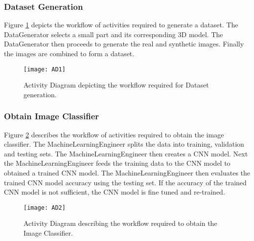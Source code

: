 \subsubsection{Dataset Generation}
Figure \ref{fig:AD1} depicts the workflow of activities required to generate a dataset. The DataGenerator selects a small part and its corresponding 3D model. The DataGenerator then proceeds to generate the real and synthetic images. Finally the images are combined to form a dataset.

\begin{figure}[H]
\centering
  \texttt{[image: AD1]}
\caption{Activity Diagram depicting the workflow required for Dataset generation.}
\label{fig:AD1}
\end{figure}

\subsubsection{Obtain Image Classifier}
Figure \ref{fig:AD2} describes the workflow of activities required to obtain the image classifier. The MachineLearningEngineer splits the data into training, validation and testing sets. The MachineLearningEngineer then creates a CNN model. Next the MachineLearningEngineer feeds the training data to the CNN model to obtained a trained CNN model. The MachineLearningEngineer then evaluates the trained CNN model accuracy using the testing set. If the accuracy of the trained CNN model is not sufficient, the CNN model is fine tuned and re-trained.

\begin{figure}[H]
\centering
  \texttt{[image: AD2]}
\caption{Activity Diagram describing the workflow required to obtain the Image Classifier.}
\label{fig:AD2}
\end{figure}
